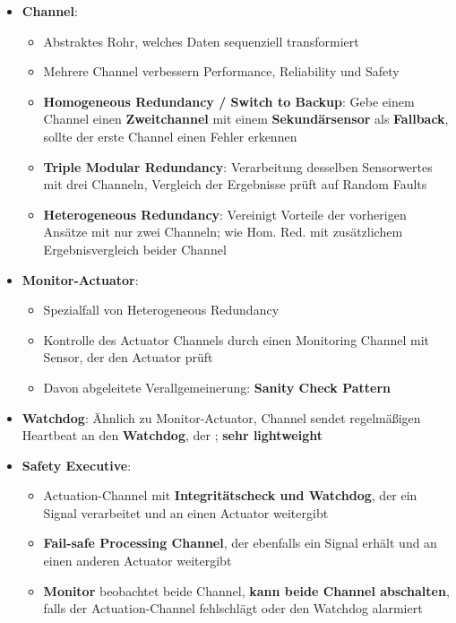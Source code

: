 \begin{itemize}
	\item \textbf{Channel}:
	\begin{itemize}
		\item Abstraktes Rohr, welches Daten sequenziell transformiert
		\item Mehrere Channel verbessern Performance, Reliability und Safety
		\item \textbf{Homogeneous Redundancy / Switch to Backup}: Gebe einem Channel einen \textbf{Zweitchannel} mit einem \textbf{Sekundärsensor} als \textbf{Fallback}, sollte der erste Channel einen Fehler erkennen
		\item \textbf{Triple Modular Redundancy}: Verarbeitung desselben Sensorwertes mit drei Channeln, Vergleich der Ergebnisse prüft auf Random Faults
		\item \textbf{Heterogeneous Redundancy}: Vereinigt Vorteile der vorherigen Ansätze mit nur zwei Channeln; wie Hom. Red. mit zusätzlichem Ergebnisvergleich beider Channel
	\end{itemize}
	\item \textbf{Monitor-Actuator}:
	\begin{itemize}
		\item Spezialfall von Heterogeneous Redundancy
		\item Kontrolle des Actuator Channels durch einen Monitoring Channel mit Sensor, der den Actuator prüft
		\item Davon abgeleitete Verallgemeinerung: \textbf{Sanity Check Pattern}
	\end{itemize}
	\item \textbf{Watchdog}: Ähnlich zu Monitor-Actuator, Channel sendet regelmäßigen Heartbeat an den \textbf{Watchdog}, der ; \textbf{sehr lightweight}
	\item \textbf{Safety Executive}:
	\begin{itemize}
		\item Actuation-Channel mit \textbf{Integritätscheck und Watchdog}, der ein Signal verarbeitet und an einen Actuator weitergibt
		\item \textbf{Fail-safe Processing Channel}, der ebenfalls ein Signal erhält und an einen anderen Actuator weitergibt
		\item \textbf{Monitor} beobachtet beide Channel, \textbf{kann beide Channel abschalten}, falls der Actuation-Channel fehlschlägt oder den Watchdog alarmiert
	\end{itemize}
\end{itemize}